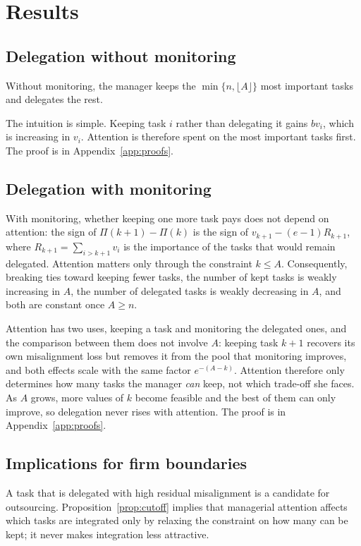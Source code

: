 \section{Results}
\label{sec:results}

\subsection{Delegation without monitoring}

\begin{proposition}
\label{prop:keep}
Without monitoring, the manager keeps the $\min\{n, \lfloor A \rfloor\}$ most important tasks and delegates the rest.
\end{proposition}

The intuition is simple. Keeping task $i$ rather than delegating it gains $b v_i$, which is increasing in $v_i$. Attention is therefore spent on the most important tasks first. The proof is in Appendix~\ref{app:proofs}.

\subsection{Delegation with monitoring}

\begin{proposition}
\label{prop:cutoff}
With monitoring, whether keeping one more task pays does not depend on attention: the sign of $\Pi(k+1) - \Pi(k)$ is the sign of $v_{k+1} - (e-1) R_{k+1}$, where $R_{k+1} = \sum_{i > k+1} v_i$ is the importance of the tasks that would remain delegated. Attention matters only through the constraint $k \leq A$. Consequently, breaking ties toward keeping fewer tasks, the number of kept tasks is weakly increasing in $A$, the number of delegated tasks is weakly decreasing in $A$, and both are constant once $A \geq n$.
\end{proposition}

Attention has two uses, keeping a task and monitoring the delegated ones, and the comparison between them does not involve $A$: keeping task $k+1$ recovers its own misalignment loss but removes it from the pool that monitoring improves, and both effects scale with the same factor $e^{-(A-k)}$. Attention therefore only determines how many tasks the manager \emph{can} keep, not which trade-off she faces. As $A$ grows, more values of $k$ become feasible and the best of them can only improve, so delegation never rises with attention. The proof is in Appendix~\ref{app:proofs}.

\subsection{Implications for firm boundaries}

A task that is delegated with high residual misalignment is a candidate for outsourcing. Proposition~\ref{prop:cutoff} implies that managerial attention affects which tasks are integrated only by relaxing the constraint on how many can be kept; it never makes integration less attractive.
